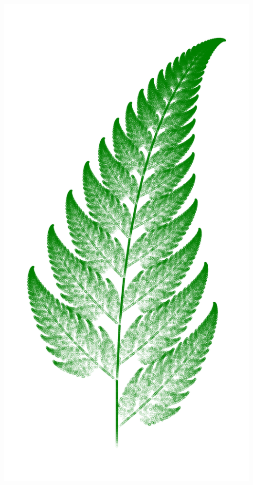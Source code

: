 \documentclass[usenames, dvipsnames, aspectratio=169]{beamer}
\begin{document}
{\begin{frame}[fragile]{}{}
    \includegraphics[height=.75\textheight]{barnsley_fern_3}

    \vfill
  \end{frame}

}
\end{document}
